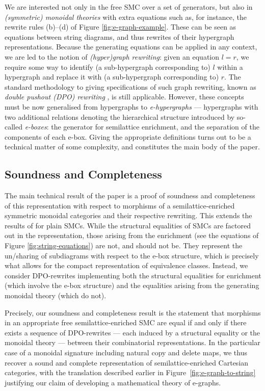 We are interested not only in the free SMC over a set of generators, but also in \textit{(symmetric) monoidal theories} with extra equations such as, for instance, the rewrite rules (b)--(d) of Figure \ref{fig:e-graph-example}. 
These can be seen as equations between string diagrams, and thus rewrites of their hypergraph representations.  
Because the generating equations can be applied in any context, we are led to the notion of \textit{(hyper)graph rewriting}: given an equation $l=r$, we require some way to identify (a sub-hypergraph corresponding to) $l$ within a hypergraph and replace it with (a sub-hypergraph corresponding to) $r$.
The standard methodology to giving specifications of such graph rewriting, known as \textit{double pushout (DPO) rewriting} \cite{dpo, bonchi_string_2022-1}, is still applicable.
However, these concepts must be now generalised from hypergraphs to \textit{e-hypergraphs} --- hypergraphs with two additional relations denoting the hierarchical structure introduced by so-called \textit{e-boxes}: the generator for semilattice enrichment, and the separation of the components of each e-box.
Giving the appropriate definitions turns out to be a technical matter of some complexity, and constitutes the main body of the paper. 

\subsection{Soundness and Completeness}
The main technical result of the paper is a proof of soundness and completeness of this representation with respect to morphisms of a semilattice-enriched symmetric monoidal categories and their respective rewriting.
This extends the results of \cite{bonchi_string_2022-2} for plain SMCs. 
While the structural equalities of SMCs are factored out in the representation,  those arising from the enrichment (see the equations of Figure \ref{fig:string-equations}) are not, and should not be. 
They represent the un/sharing of subdiagrams with respect to the e-box structure,  which is precisely what allows for the compact representation of equivalence classes.  
Instead, we consider DPO-rewrites implementing both the structural equalities for enrichment (which involve the e-box structure) and the equalities arising from the generating monoidal theory (which do not).  

Precisely,  our soundness and completeness result is the statement that morphisms in an appropriate free semilattice-enriched SMC are equal  if and only if there exists a sequence of DPO-rewrites --- each induced by a structural equality or the monoidal theory --- between their combinatorial representations. 
In the particular case of a monoidal signature including natural copy and delete maps,  we thus recover a sound and complete representation of semilattice-enriched Cartesian categories,  with the translation described earlier in Figure~\ref{fig:e-graph-to-string} justifying our claim of developing a mathematical theory of e-graphs. 

